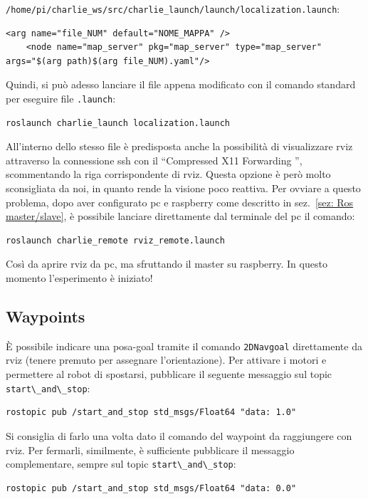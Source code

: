 \verb|/home/pi/charlie_ws/src/charlie_launch/launch/localization.launch|:

\begin{lstlisting}[style=xml, firstnumber=14]
	<arg name="file_NUM" default="NOME_MAPPA" />
	<node name="map_server" pkg="map_server" type="map_server" args="$(arg path)$(arg file_NUM).yaml"/>
\end{lstlisting}

Quindi, si può adesso lanciare il file appena modificato con il comando standard per eseguire file \verb|.launch|:
\begin{lstlisting}[style=bash]
	roslaunch charlie_launch localization.launch
\end{lstlisting}

All'interno dello stesso file è predisposta anche la possibilità di visualizzare rviz attraverso la connessione ssh con il ``Compressed X11 Forwarding '', 
scommentando la riga corrispondente di rviz. Questa opzione è però molto sconsigliata da noi, in quanto rende la visione poco reattiva. Per ovviare a questo 
problema, dopo aver configurato pc e raspberry come descritto in sez.~\ref{sez: Ros master/slave}, è possibile lanciare direttamente dal terminale del pc il comando:

\begin{lstlisting}[style=bashPC]
	roslaunch charlie_remote rviz_remote.launch
\end{lstlisting}
Così da aprire rviz da pc, ma sfruttando il master su raspberry.
In questo momento l'esperimento è iniziato!

\subsection{Waypoints}
\`E possibile indicare una posa-goal tramite il comando \texttt{2DNavgoal} direttamente da rviz (tenere premuto per assegnare l'orientazione).
Per attivare i motori e permettere al robot di spostarsi, pubblicare il seguente messaggio sul topic \verb|start\_and\_stop|:

\begin{lstlisting}[style=bash]
	rostopic pub /start_and_stop std_msgs/Float64 "data: 1.0"
\end{lstlisting}
Si consiglia di farlo una volta dato il comando del waypoint da raggiungere con rviz.
Per fermarli, similmente, è sufficiente pubblicare il messaggio complementare, sempre sul topic \verb|start\_and\_stop|:

\begin{lstlisting}[style=bash]
	rostopic pub /start_and_stop std_msgs/Float64 "data: 0.0"
\end{lstlisting}

